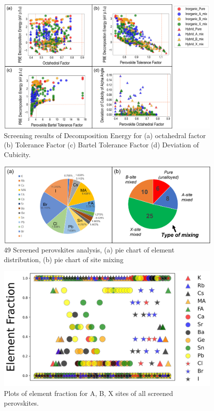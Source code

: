 \documentclass[twoside, twocolumn, 9pt, draft]{article}
\begin{document}
\begin{figure}
\centering
\includegraphics[width=.9\linewidth]{./figs/screening_factor.png}
\caption{\label{fig:cuts} Screening results of Decomposition Energy for (a) octahedral factor (b) Tolerance Factor (c) Bartel Tolerance Factor (d) Deviation of Cubicity.}
\end{figure}

\begin{figure}
\centering
\includegraphics[width=.9\linewidth]{./figs/screening_pie.png}
\caption{\label{fig:leftover} 49 Screened perovskites analysis, (a) pie chart of element distribution, (b) pie chart of site mixing}
\end{figure}

\begin{figure}
\centering
\includegraphics[width=.9\linewidth]{./figs/Element_Frac.png}
\caption{\label{fig:leftover_comp} Plots of element fraction for A, B, X sites of all screened perovskites.}
\end{figure}
\end{document}
